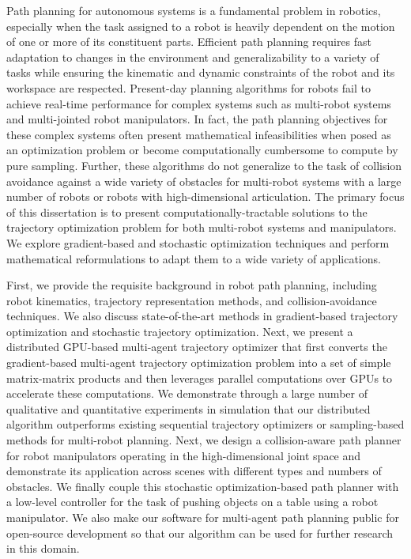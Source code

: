 Path planning for autonomous systems is a fundamental problem in robotics, especially when the task assigned to a robot is heavily dependent on the motion of one or more of its constituent parts. Efficient path planning requires fast adaptation to changes in the environment and generalizability to a variety of tasks while ensuring the kinematic and dynamic constraints of the robot and its workspace are respected. Present-day planning algorithms for robots fail to achieve real-time performance for complex systems such as multi-robot systems and multi-jointed robot manipulators. In fact, the path planning objectives for these complex systems often present mathematical infeasibilities when posed as an optimization problem or become computationally cumbersome to compute by pure sampling. Further, these algorithms do not generalize to the task of collision avoidance against a wide variety of obstacles for multi-robot systems with a large number of robots or robots with high-dimensional articulation. The primary focus of this dissertation is to present computationally-tractable solutions to the trajectory optimization problem for both multi-robot systems and manipulators. We explore gradient-based and stochastic optimization techniques and perform mathematical reformulations to adapt them to a wide variety of applications.

First, we provide the requisite background in robot path planning, including robot kinematics, trajectory representation methods, and collision-avoidance techniques. We also discuss state-of-the-art methods in gradient-based trajectory optimization and stochastic trajectory optimization. Next, we present a distributed GPU-based multi-agent trajectory optimizer that first converts the gradient-based multi-agent trajectory optimization problem into a set of simple matrix-matrix products and then leverages parallel computations over GPUs to accelerate these computations. We demonstrate through a large number of qualitative and quantitative experiments in simulation that our distributed algorithm outperforms existing sequential trajectory optimizers or sampling-based methods for multi-robot planning. Next, we design a collision-aware path planner for robot manipulators operating in the high-dimensional joint space and demonstrate its application across scenes with different types and numbers of obstacles. We finally couple this stochastic optimization-based path planner with a low-level controller for the task of pushing objects on a table using a robot manipulator. We also make our software for multi-agent path planning public for open-source development so that our algorithm can be used for further research in this domain.
